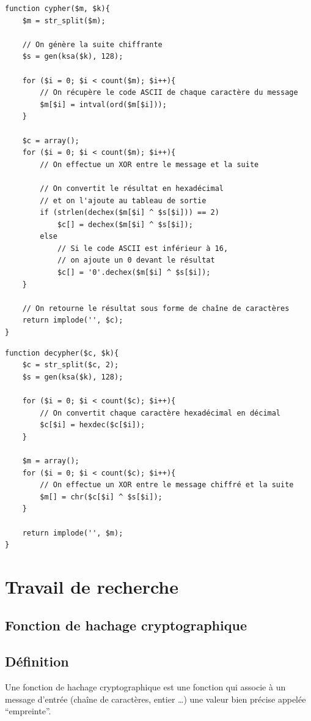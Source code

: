 \documentclass[12pt, a4paper]{article}
\begin{document}
\begin{lstlisting}[name=Fonction de chiffrement]
function cypher($m, $k){
    $m = str_split($m);
    
    // On génère la suite chiffrante
    $s = gen(ksa($k), 128);

    for ($i = 0; $i < count($m); $i++){
        // On récupère le code ASCII de chaque caractère du message
        $m[$i] = intval(ord($m[$i]));
    }

    $c = array();
    for ($i = 0; $i < count($m); $i++){
        // On effectue un XOR entre le message et la suite

        // On convertit le résultat en hexadécimal
        // et on l'ajoute au tableau de sortie
        if (strlen(dechex($m[$i] ^ $s[$i])) == 2)
            $c[] = dechex($m[$i] ^ $s[$i]);
        else
            // Si le code ASCII est inférieur à 16,
            // on ajoute un 0 devant le résultat
            $c[] = '0'.dechex($m[$i] ^ $s[$i]);
    }

    // On retourne le résultat sous forme de chaîne de caractères
    return implode('', $c);
}
\end{lstlisting}

\begin{lstlisting}[name=Fonction de déchiffrement]
function decypher($c, $k){
    $c = str_split($c, 2);
    $s = gen(ksa($k), 128);

    for ($i = 0; $i < count($c); $i++){
        // On convertit chaque caractère hexadécimal en décimal
        $c[$i] = hexdec($c[$i]);
    }

    $m = array();
    for ($i = 0; $i < count($c); $i++){
        // On effectue un XOR entre le message chiffré et la suite
        $m[] = chr($c[$i] ^ $s[$i]);
    }

    return implode('', $m);
}
\end{lstlisting}

\section{Travail de recherche}

\subsection{Fonction de hachage cryptographique}

\subsection*{Définition}
Une fonction de hachage cryptographique est une fonction qui associe à un message d'entrée
(chaîne de caractères, entier …) une valeur bien précise appelée “empreinte”.
\end{document}

